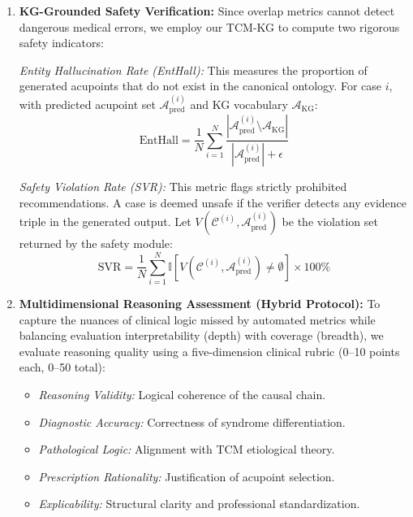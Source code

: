\documentclass[preprint,5p,times,twocolumn,fleqn]{elsarticle}
\begin{document}
\begin{enumerate}
    \item \textbf{KG-Grounded Safety Verification:}
    Since overlap metrics cannot detect dangerous medical errors, we employ our TCM-KG to compute two rigorous safety indicators:
    
    \textit{Entity Hallucination Rate (EntHall):} This measures the proportion of generated acupoints that do not exist in the canonical ontology. For case $i$, with predicted acupoint set $\mathcal{A}^{(i)}_{\text{pred}}$ and KG vocabulary $\mathcal{A}_{\text{KG}}$:
    \begin{equation}
    \label{eq:enthall_case}
    \mathrm{EntHall}=\frac{1}{N}\sum_{i=1}^{N}
    \frac{\left|\mathcal{A}^{(i)}_{\text{pred}}\setminus \mathcal{A}_{\text{KG}}\right|}
    {\left|\mathcal{A}^{(i)}_{\text{pred}}\right|+\epsilon}
    \end{equation}
    
    \textit{Safety Violation Rate (SVR):} This metric flags strictly prohibited recommendations. A case is deemed unsafe if the verifier detects any evidence triple in the generated output. Let $V(\mathcal{C}^{(i)}, \mathcal{A}^{(i)}_{\text{pred}})$ be the violation set returned by the safety module:
    \begin{equation}
    \label{eq:svr}
    \mathrm{SVR}=\frac{1}{N}\sum_{i=1}^{N}\mathbb{I}\!\left[V(\mathcal{C}^{(i)},\mathcal{A}^{(i)}_{\text{pred}})\neq \emptyset\right]\times 100\%
    \end{equation}

    \item \textbf{Multidimensional Reasoning Assessment (Hybrid Protocol):}
    To capture the nuances of clinical logic missed by automated metrics while balancing evaluation interpretability (depth) with coverage (breadth), we evaluate reasoning quality using a five-dimension clinical rubric (0--10 points each, 0--50 total):
    \begin{itemize}
        \item[] \textit{Reasoning Validity:} Logical coherence of the causal chain.
        \item[] \textit{Diagnostic Accuracy:} Correctness of syndrome differentiation.
        \item[] \textit{Pathological Logic:} Alignment with TCM etiological theory.
        \item[] \textit{Prescription Rationality:} Justification of acupoint selection.
        \item[] \textit{Explicability:} Structural clarity and professional standardization.
    \end{itemize}
    

\end{enumerate}
\end{document}
